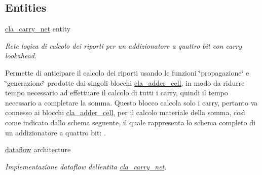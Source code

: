 \subsection*{Entities}
\begin{DoxyCompactItemize}
\item 
\hyperlink{classcla__carry__net}{cla\+\_\+carry\+\_\+net} entity
\begin{DoxyCompactList}\small\item\em Rete logica di calcolo dei riporti per un addizionatore a quattro bit con carry lookahead.

Permette di anticipare il calcolo dei riporti usando le funzioni \char`\"{}propagazione\char`\"{} e \char`\"{}generazione\char`\"{} prodotte dai singoli blocchi \hyperlink{classcla__adder__cell}{cla\+\_\+adder\+\_\+cell}, in modo da ridurre tempo necessario ad effettuare il calcolo di tutti i carry, quindi il tempo necessario a completare la somma. Questo blocco calcola solo i carry, pertanto va connesso ai blocchi \hyperlink{classcla__adder__cell}{cla\+\_\+adder\+\_\+cell}, per il calcolo materiale della somma, così come indicato dallo schema seguente, il quale rappresenta lo schema completo di un addizionatore a quattro bit\+: . \end{DoxyCompactList}\item 
\hyperlink{classcla__carry__net_1_1dataflow}{dataflow} architecture
\begin{DoxyCompactList}\small\item\em Implementazione dataflow dell\textquotesingle{}entita\textquotesingle{} \hyperlink{classcla__carry__net}{cla\+\_\+carry\+\_\+net}.


\end{DoxyCompactList}
\end{DoxyCompactItemize}
